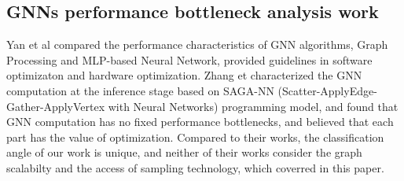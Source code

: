 \subsection{GNNs performance bottleneck analysis work}
Yan et al \cite{yan2020_analysis_gcns_gpu} compared the performance characteristics of GNN algorithms, Graph Processing and MLP-based Neural Network, provided guidelines in software optimizaton and hardware optimization.
Zhang et \cite{zhang2020_analysis_neugraph} characterized the GNN computation at the inference stage based on SAGA-NN (Scatter-ApplyEdge-Gather-ApplyVertex with Neural Networks) programming model, 
and found that GNN computation has no fixed performance bottlenecks, and believed that each part has the value of optimization. 
Compared to their works, the classification angle of our work is unique, and neither of their works consider the graph scalabilty and the access of sampling technology,
which coverred in this paper.